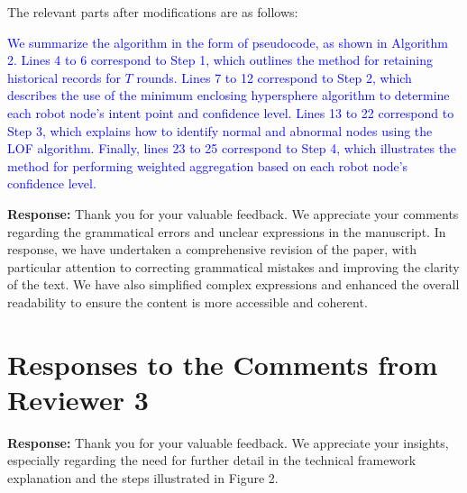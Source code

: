 \documentclass[a4paper,twoside,11pt,dvipsnames]{reviewresponse}
\begin{document}

The relevant parts after modifications are as follows:

\textcolor{blue}{We summarize the algorithm in the form of pseudocode, as shown in Algorithm 2. Lines 4 to 6 correspond to Step 1, which outlines the method for retaining historical records for \(T\) rounds. Lines 7 to 12 correspond to Step 2, which describes the use of the minimum enclosing hypersphere algorithm to determine each robot node's intent point and confidence level. Lines 13 to 22 correspond to Step 3, which explains how to identify normal and abnormal nodes using the LOF algorithm. Finally, lines 23 to 25 correspond to Step 4, which illustrates the method for performing weighted aggregation based on each robot node's confidence level.}

\textbf{Response:} 
Thank you for your valuable feedback. We appreciate your comments regarding the grammatical errors and unclear expressions in the manuscript.
In response, we have undertaken a comprehensive revision of the paper, with particular attention to correcting grammatical mistakes and improving the clarity of the text. We have also simplified complex expressions and enhanced the overall readability to ensure the content is more accessible and coherent.

\newpage

\section{Responses to the Comments from Reviewer 3}

\textbf{Response:} 
Thank you for your valuable feedback. We appreciate your insights, especially regarding the need for further detail in the technical framework explanation and the steps illustrated in Figure 2.
\end{document}
